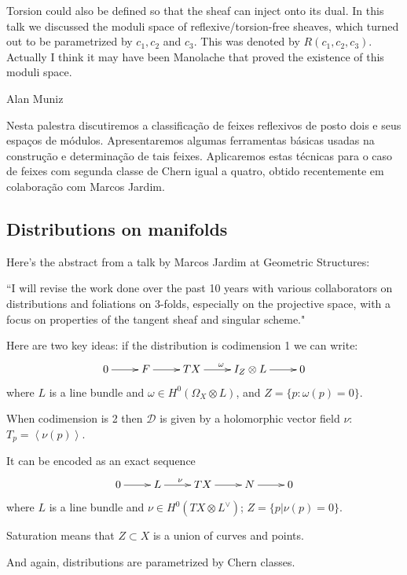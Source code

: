 \begin{remark}\leavevmode
\label{remark-reflexive-talk}
Torsion could also be defined so that the sheaf can inject onto its dual. In
this talk we discussed the moduli space of reflexive/torsion-free sheaves, which
turned out to be parametrized by $c_1, c_2$ and $c_3$. This was denoted by 
$R(c_1,c_2,c_3)$. Actually I think it may have been Manolache that proved the
existence of this moduli space.


Alan Muniz

Nesta palestra discutiremos a classificação de feixes reflexivos de posto dois e
seus espaços de módulos. Apresentaremos algumas ferramentas básicas usadas na
construção e determinação de tais feixes. Aplicaremos estas técnicas para o caso
de feixes com segunda classe de Chern igual a quatro, obtido recentemente em
colaboração com Marcos Jardim.
\end{remark}

\subsection{Distributions on manifolds}
\label{subsection-distributions-on-manifolds}

Here's the abstract from a talk by Marcos Jardim at Geometric Structures:

``I will revise the work done over the past 10 years with various collaborators
on distributions and foliations on 3-folds, especially on the projective space,
with a focus on properties of the tangent sheaf and singular scheme."

Here are two key ideas: if the distribution is codimension 1 we can write:
$$
\xymatrix{
0\ar[r]&F\ar[r]&TX\ar[r]^{\omega}&I_Z \otimes L\ar[r]&0
}
$$
where $L$ is a line bundle and $\omega \in H^{0}(\Omega_X \otimes L)$, and
$Z=\{p:\omega(p)=0\}$.

When codimension is 2 then $\mathcal{D}$ is given by a holomorphic vector field 
$\nu$: $T_p=\left<\nu(p)\right>$.

It can be encoded as an exact sequence
$$
\xymatrix{
	0\ar[r]&L\ar[r]^{\nu}&TX\ar[r]&N\ar[r]&0
}
$$
where $L$ is a line bundle and $\nu \in H^{0}(TX \otimes L^\vee)$;
  $Z=\{p | \nu(p) = 0\}$.

\begin{remark}
\label{remark-stauration}
Saturation means that $Z \subset X$ is a union of curves and points.
\end{remark}

And again, distributions are parametrized by Chern classes.

